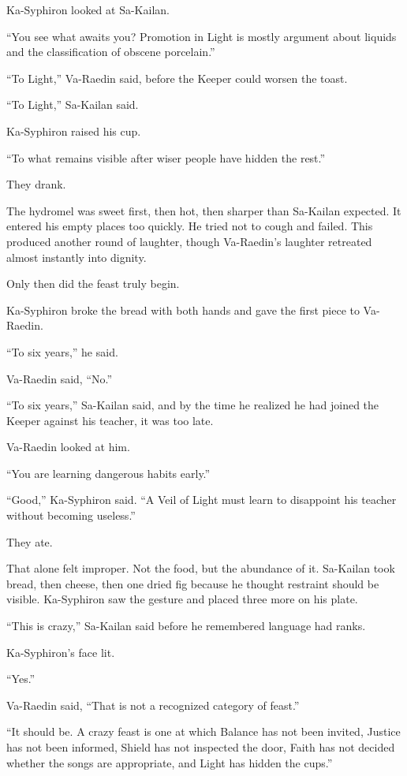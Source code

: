 Ka-Syphiron looked at Sa-Kailan.\par
“You see what awaits you? Promotion in Light is mostly argument about liquids and the classification of obscene porcelain.”\par
“To Light,” Va-Raedin said, before the Keeper could worsen the toast.\par
“To Light,” Sa-Kailan said.\par
Ka-Syphiron raised his cup.\par
“To what remains visible after wiser people have hidden the rest.”\par
They drank.\par
The hydromel was sweet first, then hot, then sharper than Sa-Kailan expected. It entered his empty places too quickly. He tried not to cough and failed. This produced another round of laughter, though Va-Raedin’s laughter retreated almost instantly into dignity.\par
Only then did the feast truly begin.\par
Ka-Syphiron broke the bread with both hands and gave the first piece to Va-Raedin.\par
“To six years,” he said.\par
Va-Raedin said, “No.”\par
“To six years,” Sa-Kailan said, and by the time he realized he had joined the Keeper against his teacher, it was too late.\par
Va-Raedin looked at him.\par
“You are learning dangerous habits early.”\par
“Good,” Ka-Syphiron said. “A Veil of Light must learn to disappoint his teacher without becoming useless.”\par
They ate.\par
That alone felt improper. Not the food, but the abundance of it. Sa-Kailan took bread, then cheese, then one dried fig because he thought restraint should be visible. Ka-Syphiron saw the gesture and placed three more on his plate.\par
“This is crazy,” Sa-Kailan said before he remembered language had ranks.\par
Ka-Syphiron’s face lit.\par
“Yes.”\par
Va-Raedin said, “That is not a recognized category of feast.”\par
“It should be. A crazy feast is one at which Balance has not been invited, Justice has not been informed, Shield has not inspected the door, Faith has not decided whether the songs are appropriate, and Light has hidden the cups.”\par

